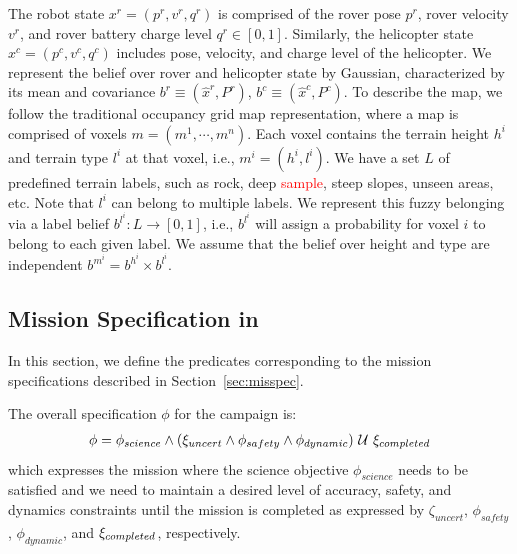 \documentclass[letterpaper]{article} %
\begin{document}
    The robot state $x^r=(p^r, v^r, q^r)$ is comprised of the rover pose $p^r$, rover velocity $v^r$, and rover battery charge level $q^r \in [0, 1]$. Similarly, the helicopter state $x^c=(p^c, v^c, q^c)$ includes pose, velocity, and charge level of the helicopter. We represent the belief over rover and helicopter state by Gaussian, characterized by its mean and covariance $b^r\equiv(\hat{x}^r,P^r)$, $b^c\equiv(\hat{x}^c,P^c)$. 
    To describe the map, we follow the traditional occupancy grid map representation, where a map is comprised of voxels $m=(m^1,\cdots,m^n)$. Each voxel contains the terrain height $h^i$ and terrain type $l^i$ at that voxel, i.e., $m^i = (h^i,l^i)$. We have a set $L$ of predefined terrain labels, such as rock, deep \textcolor{red}{sample}, steep slopes, unseen areas, etc. Note that $l^i$ can belong to multiple labels. We represent this fuzzy belonging via a label belief $b^{l^i}:L\rightarrow[0,1]$, i.e., $b^{l^i}$ will assign a probability for voxel $i$ to belong to each given label. We assume that the belief over height and type are independent $b^{m^i} = b^{h^i}\times b^{l^i}$. 
    
    
    \subsection{Mission Specification in \DTL}
    \label{sec:gdtlspec}
    In this section, we define the \DTL predicates corresponding to the mission specifications described in Section~\ref{sec:misspec}.
    
    The overall specification $\phi$ for the campaign is:
    {\small
    \begin{align}
    \label{eq:overallspec}
        \phi = \phi_{science} \land (\xi_{uncert} \land \phi_{safety} \land \phi_{dynamic}) \ \mathcal{U}\  \xi_{completed}
    \end{align}
    }%
    which expresses the mission where the science objective $\phi_{science}$ needs to be satisfied and we need to maintain a desired level of accuracy,
    safety, and dynamics constraints until the mission is completed as expressed by $\zeta_{uncert}$, $\phi_{safety}$, $\phi_{dynamic}$, and
    $\xi_{completed}$, respectively.
\end{document}
